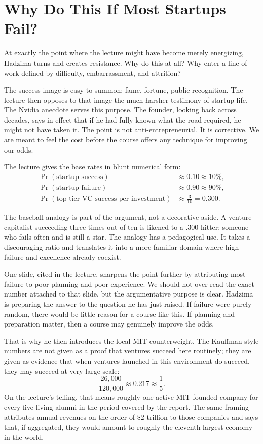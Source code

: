 \section{Why Do This If Most Startups Fail?}

At exactly the point where the lecture might have become merely energizing, Hadzima turns and creates resistance. Why do this at all? Why enter a line of work defined by difficulty, embarrassment, and attrition?

The success image is easy to summon: fame, fortune, public recognition. The lecture then opposes to that image the much harsher testimony of startup life. The Nvidia anecdote serves this purpose. The founder, looking back across decades, says in effect that if he had fully known what the road required, he might not have taken it. The point is not anti-entrepreneurial. It is corrective. We are meant to feel the cost before the course offers any technique for improving our odds.

The lecture gives the base rates in blunt numerical form:
\begin{align}
\Pr(\text{startup success}) &\approx 0.10 \approx 10\%, \\
\Pr(\text{startup failure}) &\approx 0.90 \approx 90\%, \\
\Pr(\text{top-tier VC success per investment}) &\approx \frac{3}{10}=0.300.
\end{align}

The baseball analogy is part of the argument, not a decorative aside. A venture capitalist succeeding three times out of ten is likened to a .300 hitter: someone who fails often and is still a star. The analogy has a pedagogical use. It takes a discouraging ratio and translates it into a more familiar domain where high failure and excellence already coexist.

One slide, cited in the lecture, sharpens the point further by attributing most failure to poor planning and poor experience. We should not over-read the exact number attached to that slide, but the argumentative purpose is clear. Hadzima is preparing the answer to the question he has just raised. If failure were purely random, there would be little reason for a course like this. If planning and preparation matter, then a course may genuinely improve the odds.

That is why he then introduces the local MIT counterweight. The Kauffman-style numbers are not given as a proof that ventures succeed here routinely; they are given as evidence that when ventures launched in this environment do succeed, they may succeed at very large scale:
\begin{equation}
\frac{26{,}000}{120{,}000}\approx 0.217 \approx \frac{1}{5}.
\end{equation}
On the lecture's telling, that means roughly one active MIT-founded company for every five living alumni in the period covered by the report. The same framing attributes annual revenues on the order of \(\$2\) trillion to those companies and says that, if aggregated, they would amount to roughly the eleventh largest economy in the world.

